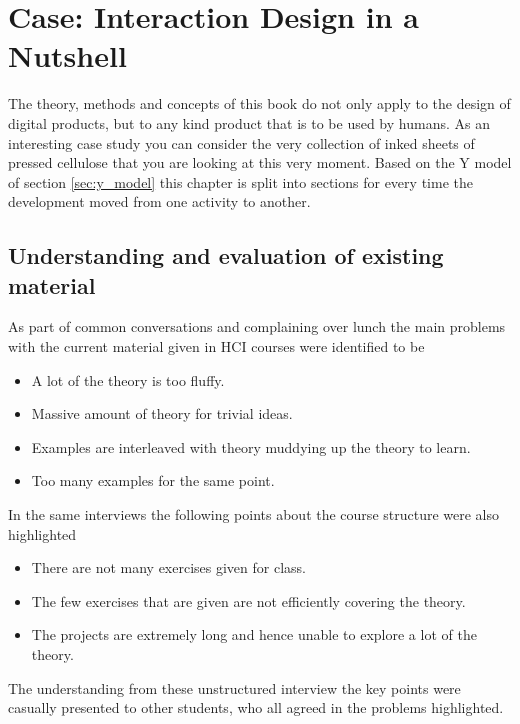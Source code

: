 \chapter{Case: Interaction Design in a Nutshell} \label{chap:case_meta}
\minitoc \newpage

The theory, methods and concepts of this book do not only apply to the design of digital products, but to any kind product that is to be used by humans. As an interesting case study you can consider the very collection of inked sheets of pressed cellulose that you are looking at this very moment. Based on the Y model of section \ref{sec:y_model} this chapter is split into sections for every time the development moved from one activity to another.

\section{Understanding and evaluation of existing material}
As part of common conversations and complaining over lunch the main problems with the current material given in HCI courses were identified to be
\begin{itemize}
  \item A lot of the theory is too fluffy.
  \item Massive amount of theory for trivial ideas.
  \item Examples are interleaved with theory muddying up the theory to learn.
  \item Too many examples for the same point.
\end{itemize}
In the same interviews the following points about the course structure were also highlighted
\begin{itemize}
  \item There are not many exercises given for class.
  \item The few exercises that are given are not efficiently covering the theory.
  \item The projects are extremely long and hence unable to explore a lot of the theory.
\end{itemize}
The understanding from these unstructured interview the key points were casually presented to other students, who all agreed in the problems highlighted.

